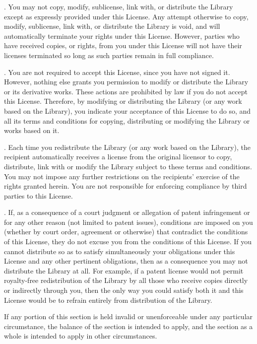 . You may not copy, modify, sublicense, link with, or distribute the Library except as expressly provided under this License. Any attempt otherwise to copy, modify, sublicense, link with, or distribute the Library is void, and will automatically terminate your rights under this License. However, parties who have received copies, or rights, from you under this License will not have their licenses terminated so long as such parties remain in full compliance. 

. You are not required to accept this License, since you have not signed it. However, nothing else grants you permission to modify or distribute the Library or its derivative works. These actions are prohibited by law if you do not accept this License. Therefore, by modifying or distributing the Library (or any work based on the Library), you indicate your acceptance of this License to do so, and all its terms and conditions for copying, distributing or modifying the Library or works based on it. 

. Each time you redistribute the Library (or any work based on the Library), the recipient automatically receives a license from the original licensor to copy, distribute, link with or modify the Library subject to these terms and conditions. You may not impose any further restrictions on the recipients' exercise of the rights granted herein. You are not responsible for enforcing compliance by third parties to this License. 

. If, as a consequence of a court judgment or allegation of patent infringement or for any other reason (not limited to patent issues), conditions are imposed on you (whether by court order, agreement or otherwise) that contradict the conditions of this License, they do not excuse you from the conditions of this License. If you cannot distribute so as to satisfy simultaneously your obligations under this License and any other pertinent obligations, then as a consequence you may not distribute the Library at all. For example, if a patent license would not permit royalty-free redistribution of the Library by all those who receive copies directly or indirectly through you, then the only way you could satisfy both it and this License would be to refrain entirely from distribution of the Library. 

If any portion of this section is held invalid or unenforceable under any particular circumstance, the balance of the section is intended to apply, and the section as a whole is intended to apply in other circumstances. 

